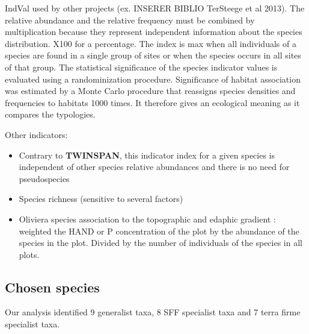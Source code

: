 \documentclass[
]{book}
\providecommand{\tightlist}{%
  \setlength{\itemsep}{0pt}\setlength{\parskip}{0pt}}
\begin{document}
IndVal used by other projects (ex. INSERER BIBLIO TerSteege et al 2013). The relative abundance and the relative frequency must be combined by multiplication because they represent independent information about the species distribution. X100 for a percentage. The index is max when all individuals of a species are found in a single group of sites or when the species occurs in all sites of that group. The statistical significance of the species indicator values is evaluated using a randominization procedure. Significance of habitat association was estimated by a Monte Carlo procedure that reassigns species densities and frequencies to habitats 1000 times. It therefore gives an ecological meaning as it compares the typologies.

Other indicators:

\begin{itemize}
\tightlist
\item
  Contrary to \textbf{TWINSPAN}, this indicator index for a given species is independent of other species relative abundances and there is no need for pseudospecies
\item
  Species richness (sensitive to several factors)
\item
  Oliviera species association to the topographic and edaphic gradient : weighted the HAND or P concentration of the plot by the abundance of the species in the plot. Divided by the number of individuals of the species in all plots.
\end{itemize}

\hypertarget{chosen-species}{%
\subsection{Chosen species}\label{chosen-species}}

Our analysis identified 9 generalist taxa, 8 SFF specialist taxa and 7 terra firme specialist taxa.
\end{document}
